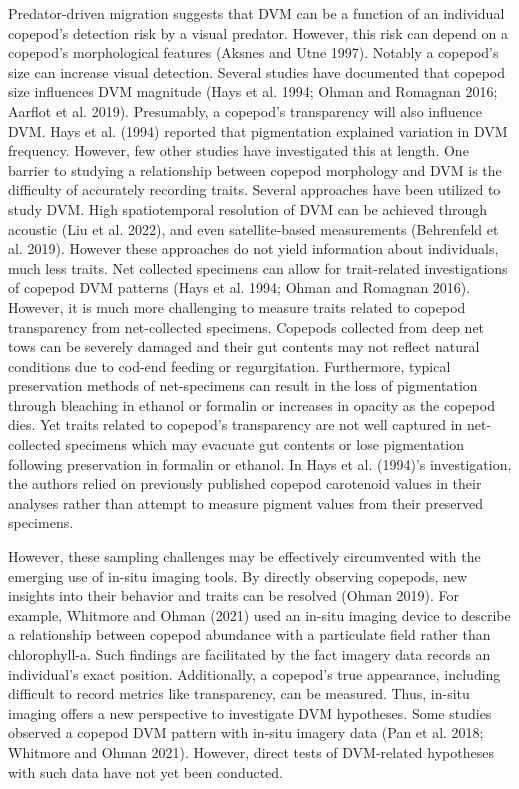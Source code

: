 \documentclass[
]{article}
\begin{document}
Predator-driven migration suggests that DVM can be a function of an
individual copepod's detection risk by a visual predator. However, this
risk can depend on a copepod's morphological features (Aksnes and Utne
1997). Notably a copepod's size can increase visual detection. Several
studies have documented that copepod size influences DVM magnitude (Hays
et al. 1994; Ohman and Romagnan 2016; Aarflot et al. 2019). Presumably,
a copepod's transparency will also influence DVM. Hays et al. (1994)
reported that pigmentation explained variation in DVM frequency.
However, few other studies have investigated this at length. One barrier
to studying a relationship between copepod morphology and DVM is the
difficulty of accurately recording traits. Several approaches have been
utilized to study DVM. High spatiotemporal resolution of DVM can be
achieved through acoustic (Liu et al. 2022), and even satellite-based
measurements (Behrenfeld et al. 2019). However these approaches do not
yield information about individuals, much less traits. Net collected
specimens can allow for trait-related investigations of copepod DVM
patterns (Hays et al. 1994; Ohman and Romagnan 2016). However, it is
much more challenging to measure traits related to copepod transparency
from net-collected specimens. Copepods collected from deep net tows can
be severely damaged and their gut contents may not reflect natural
conditions due to cod-end feeding or regurgitation. Furthermore, typical
preservation methods of net-specimens can result in the loss of
pigmentation through bleaching in ethanol or formalin or increases in
opacity as the copepod dies. Yet traits related to copepod's
transparency are not well captured in net-collected specimens which may
evacuate gut contents or lose pigmentation following preservation in
formalin or ethanol. In Hays et al. (1994)'s investigation, the authors
relied on previously published copepod carotenoid values in their
analyses rather than attempt to measure pigment values from their
preserved specimens.

However, these sampling challenges may be effectively circumvented with
the emerging use of in-situ imaging tools. By directly observing
copepods, new insights into their behavior and traits can be resolved
(Ohman 2019). For example, Whitmore and Ohman (2021) used an in-situ
imaging device to describe a relationship between copepod abundance with
a particulate field rather than chlorophyll-a. Such findings are
facilitated by the fact imagery data records an individual's exact
position. Additionally, a copepod's true appearance, including difficult
to record metrics like transparency, can be measured. Thus, in-situ
imaging offers a new perspective to investigate DVM hypotheses. Some
studies observed a copepod DVM pattern with in-situ imagery data (Pan et
al. 2018; Whitmore and Ohman 2021). However, direct tests of DVM-related
hypotheses with such data have not yet been conducted.
\end{document}
